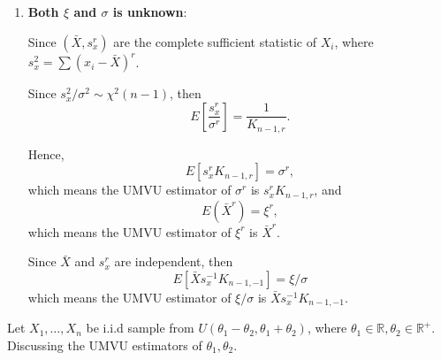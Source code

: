 \begin{solution}
\begin{enumerate}
        \item \textbf{Both $\xi$ and $\sigma$ is unknown}:

              Since $(\bar{X},s_x^r)$ are the complete sufficient statistic of $X_i$, where $s_x^2=\sum\left(x_{i}-\bar{X}\right)^r$.

              Since $s_x^2/\sigma^2\sim\chi^2(n-1)$, then
              \begin{equation*}
                  E\left[\frac{s_x^r}{\sigma^r}\right]=\frac{1}{K_{n-1,r}}.
              \end{equation*}

              Hence,
              \begin{equation*}
                  E\left[s_x^rK_{n-1,r}\right]=\sigma^r,
              \end{equation*}
              which means the UMVU estimator of $\sigma^r$ is $s_x^rK_{n-1,r}$,
              and
              \begin{equation*}
                  E(\bar{X}^r)=\xi^r,
              \end{equation*}
              which means the UMVU estimator of $\xi^r$ is $\bar{X}^r$.

              Since $\bar{X}$ and $s_x^r$ are independent, then
              \begin{equation*}
                  E[\bar{X}s_x^{-1}K_{n-1,-1}]=\xi/\sigma
              \end{equation*}
              which means the UMVU estimator of $\xi/\sigma$ is $\bar{X}s_x^{-1}K_{n-1,-1}$.
    \end{enumerate}
\end{solution}

\begin{example}[]
    Let $X_{1},\ldots,X_{n}$ be i.i.d sample from $U\left(\theta_1-\theta_2,\theta_1+\theta_2\right)$, where $\theta_1\in\mathbb{R},\theta_2\in\mathbb{R}^+$. Discussing the UMVU estimators of $\theta_1,\theta_2$.
\end{example}

